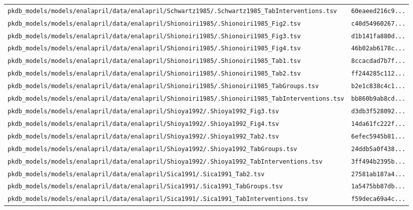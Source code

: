 \documentclass{article}
\begin{document}
\begin{longtable}{ll}
\texttt{pkdb\_models/models/enalapril/data/enalapril/Schwartz1985/.Schwartz1985\_TabInterventions.tsv} & \texttt{60eaeed216c9...} \\
\texttt{pkdb\_models/models/enalapril/data/enalapril/Shionoiri1985/.Shionoiri1985\_Fig2.tsv} & \texttt{c40d54960267...} \\
\texttt{pkdb\_models/models/enalapril/data/enalapril/Shionoiri1985/.Shionoiri1985\_Fig3.tsv} & \texttt{d1b141fa880d...} \\
\texttt{pkdb\_models/models/enalapril/data/enalapril/Shionoiri1985/.Shionoiri1985\_Fig4.tsv} & \texttt{46b02ab6178c...} \\
\texttt{pkdb\_models/models/enalapril/data/enalapril/Shionoiri1985/.Shionoiri1985\_Tab1.tsv} & \texttt{8ccacdad7b7f...} \\
\texttt{pkdb\_models/models/enalapril/data/enalapril/Shionoiri1985/.Shionoiri1985\_Tab2.tsv} & \texttt{ff244285c112...} \\
\texttt{pkdb\_models/models/enalapril/data/enalapril/Shionoiri1985/.Shionoiri1985\_TabGroups.tsv} & \texttt{b2e1c838c4c1...} \\
\texttt{pkdb\_models/models/enalapril/data/enalapril/Shionoiri1985/.Shionoiri1985\_TabInterventions.tsv} & \texttt{bb860b9ab8cd...} \\
\texttt{pkdb\_models/models/enalapril/data/enalapril/Shioya1992/.Shioya1992\_Fig3.tsv} & \texttt{d3db3f528092...} \\
\texttt{pkdb\_models/models/enalapril/data/enalapril/Shioya1992/.Shioya1992\_Fig4.tsv} & \texttt{14da61fc222f...} \\
\texttt{pkdb\_models/models/enalapril/data/enalapril/Shioya1992/.Shioya1992\_Tab2.tsv} & \texttt{6efec5945b81...} \\
\texttt{pkdb\_models/models/enalapril/data/enalapril/Shioya1992/.Shioya1992\_TabGroups.tsv} & \texttt{24ddb5a0f438...} \\
\texttt{pkdb\_models/models/enalapril/data/enalapril/Shioya1992/.Shioya1992\_TabInterventions.tsv} & \texttt{3ff494b2395b...} \\
\texttt{pkdb\_models/models/enalapril/data/enalapril/Sica1991/.Sica1991\_Tab2.tsv} & \texttt{27581ab187a4...} \\
\texttt{pkdb\_models/models/enalapril/data/enalapril/Sica1991/.Sica1991\_TabGroups.tsv} & \texttt{1a5475bb87db...} \\
\texttt{pkdb\_models/models/enalapril/data/enalapril/Sica1991/.Sica1991\_TabInterventions.tsv} & \texttt{f59deca69a4c...} \\

\end{longtable}
\end{document}
